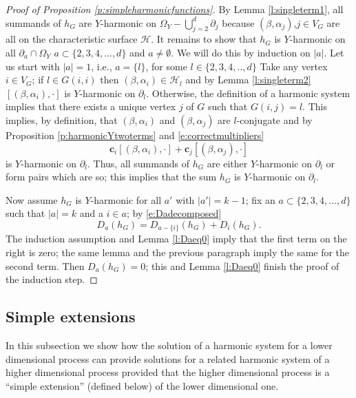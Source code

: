 \documentclass[11pt,a4paper]{article}
\begin{document}
\begin{proof}[Proof of Proposition \ref{p:simpleharmonicfunctions}]
By Lemma \ref{l:singleterm1},
all summands of $h_G$ are $Y$-harmonic on $\Omega_Y-\bigcup_{j=2}^d \partial_j$ because $(\beta,\alpha_j)$,$ j \in V_G$ are all on the characteristic surface
${\mathcal H}$.
It remains to show that $h_G$ is $Y$-harmonic on all $\partial_a \cap \Omega_Y$
$a \subset \{2,3,4,...,d\}$ and $a \neq \emptyset.$ We will do this
by induction on $|a|$. Let us start with $|a|=1$, i.e., $a = \{l\}$, for 
some $l \in \{2,3,4,..,d\}$
Take any vertex $i \in V_G$; if $l \in G(i,i)$
then $(\beta,\alpha_i) \in {\mathcal H}_l$ and by Lemma \ref{l:singleterm2}
$[(\beta,\alpha_i),\cdot]$ is $Y$-harmonic on $\partial_l$.
Otherwise, the definition of a harmonic system implies that
there exists a unique vertex $j$ of $G$
such that $G(i,j) = l$. This implies, by definition, that
 $(\beta,\alpha_i)$ and $(\beta,\alpha_{j})$
are $l$-conjugate and by Proposition \ref{p:harmonicYtwoterms} 
and \eqref{e:correctmultipliers} 
\[
{\boldsymbol c}_i [(\beta,\alpha_i),\cdot] + {\boldsymbol c}_{j} [ (\beta,\alpha_{j}),\cdot]
\]
is $Y$-harmonic on $\partial_l$. 
Thus, all summands
of $h_G$ are either $Y$-harmonic on $\partial_l$ 
or form pairs which are so;
this implies that the sum $h_G$ is $Y$-harmonic on $\partial_l$.

Now assume $h_G$ is $Y$-harmonic for all
$a'$ with $|a'| = k-1$; fix an $a \subset \{2,3,4,...,d\}$
such that $|a| = k$ and a $i \in a$;
by \eqref{e:Dadecomposed}
\[
D_a( h_G) = D_{a-\{i\}}(h_G) + D_i(h_G).
\]
The induction assumption and Lemma \ref{l:Daeq0} imply 
that the first term on the right is zero; the same lemma
and the previous paragraph imply the same for the second term.
Then $D_a(h_G) = 0$; this and Lemma \ref{l:Daeq0} finish the
proof of the induction step.
\end{proof}


\subsection{Simple extensions}
In this subsection we show how the solution of a harmonic system 
for a lower dimensional process can provide solutions for a related harmonic
system of a higher dimensional process provided that the higher
dimensional process is a ``simple extension'' (defined below) 
of the lower dimensional one. 
\end{document}
